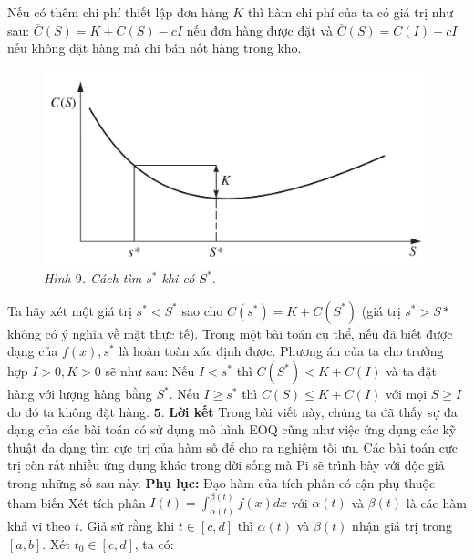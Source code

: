 \begin{multicols}{2}
	\vskip 0.1cm
	Nếu có thêm chi phí thiết lập đơn hàng $K$ thì hàm chi phí của ta có giá trị như sau:
	\vskip 0.1cm
	$\overline{C}(S) = K + C(S) - cI$ nếu đơn hàng được đặt
	và $\overline{C}(S) = C(I)- cI$ nếu không đặt hàng mà chi bán nốt hàng trong kho.
	\begin{figure}[H]
		\vspace*{-5pt}
		\centering
		\captionsetup{labelformat= empty, justification=centering}
		\includegraphics[width= 1\linewidth]{10}
		\caption{\small\textit{\color{toanhocdoisong}Hình $9$. Cách tìm $s^*$ khi có $S^*$.}}
		\vspace*{-10pt}
	\end{figure}
	Ta hãy xét một giá trị $s^*<S^*$ sao cho $C(s^* )=K+C(S^*)$ (giá trị $s^*>S*$ không có ý nghĩa về mặt thực tế). Trong một bài toán cụ thể, nếu đã biết được dạng của $f(x), s^*$ là hoàn toàn xác định được. 
	\vskip 0.1cm
	Phương án của ta cho trường hợp $I>0,K>0$ sẽ như sau:
	\vskip 0.1cm
	Nếu $I<s^*$ thì $C(S^* )<K+C(I)$ và ta đặt hàng với lượng hàng bằng $S^*$.
	\vskip 0.1cm
	Nếu $I \ge s^*$ thì $C(S) \le K+C(I)$ với mọi $S \ge I$ do đó ta không đặt hàng.
	\vskip 0.1cm
	$\pmb{5.}$ \textbf{\color{toanhocdoisong}Lời kết}
	\vskip 0.1cm
	Trong bài viết này, chúng ta đã thấy sự đa dạng của các bài toán có sử dụng mô hình EOQ cũng như việc ứng dụng các kỹ thuật đa dạng tìm cực trị của hàm số để cho ra nghiệm tối ưu. Các bài toán cực trị còn rất nhiều ứng dụng khác trong đời sống mà Pi sẽ trình bày với độc giả trong những số sau này.
	\vskip 0.1cm
	\textbf{\color{toanhocdoisong}Phụ lục:} Đạo hàm của tích phân có cận phụ thuộc tham biến
	\vskip 0.1cm
	Xét tích phân $I(t) = \int_{\alpha(t)}^{\beta(t)}{f(x)dx}$ với $ \alpha(t)$ và  $\beta(t)$ là các hàm khả vi theo $t$. Giả sử rằng khi $t \in [c,d]$ thì  $\alpha(t)$ và  $\beta(t)$ nhận giá trị trong $[a,b]$.
	\vskip 0.1cm
	Xét $t_0 \in [c,d]$, ta có:
	\begin{align*}

\end{align*}
\end{multicols}
